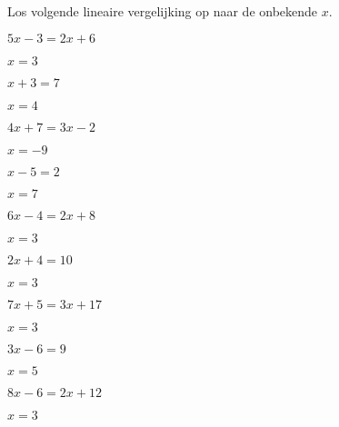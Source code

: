 \documentclass{ximera}
\begin{document}
	\author{Wiskunde Op Maat}

   
\begin{exercise} Los volgende lineaire vergelijking op naar de onbekende \(x\).
  \begin{xmmulticols}

    \begin{question} \( 5x - 3  = 2x + 6   \) \begin{uitkomst} \( x = 3   \) \end{uitkomst} \end{question}
    \begin{question} \( x + 3   = 7        \) \begin{uitkomst} \( x = 4   \) \end{uitkomst} \end{question}
    \begin{question} \( 4x + 7  = 3x - 2   \) \begin{uitkomst} \( x = -9  \) \end{uitkomst} \end{question}
    \begin{question} \( x - 5   = 2        \) \begin{uitkomst} \( x = 7   \) \end{uitkomst} \end{question}
    \begin{question} \( 6x - 4  = 2x + 8   \) \begin{uitkomst} \( x = 3   \) \end{uitkomst} \end{question}
    \begin{question} \( 2x + 4  = 10       \) \begin{uitkomst} \( x = 3   \) \end{uitkomst} \end{question}
    \begin{question} \( 7x + 5  = 3x + 17  \) \begin{uitkomst} \( x = 3   \) \end{uitkomst} \end{question}
    \begin{question} \( 3x - 6  = 9        \) \begin{uitkomst} \( x = 5   \) \end{uitkomst} \end{question}
    \begin{question} \( 8x - 6  = 2x + 12  \) \begin{uitkomst} \( x = 3   \) \end{uitkomst} \end{question}

\end{xmmulticols}
\end{exercise}
\end{document}

